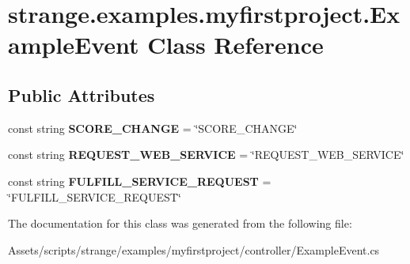 \hypertarget{classstrange_1_1examples_1_1myfirstproject_1_1_example_event}{\section{strange.\-examples.\-myfirstproject.\-Example\-Event Class Reference}
\label{classstrange_1_1examples_1_1myfirstproject_1_1_example_event}
}
\subsection*{Public Attributes}
\begin{DoxyCompactItemize}
\item 
\hypertarget{classstrange_1_1examples_1_1myfirstproject_1_1_example_event_ad6592bc3c2d72644aff81b16bce13942}{const string {\bfseries S\-C\-O\-R\-E\-\_\-\-C\-H\-A\-N\-G\-E} = \char`\"{}S\-C\-O\-R\-E\-\_\-\-C\-H\-A\-N\-G\-E\char`\"{}}\label{classstrange_1_1examples_1_1myfirstproject_1_1_example_event_ad6592bc3c2d72644aff81b16bce13942}

\item 
\hypertarget{classstrange_1_1examples_1_1myfirstproject_1_1_example_event_a901b6e1a0147805f834eb722d52f6ba4}{const string {\bfseries R\-E\-Q\-U\-E\-S\-T\-\_\-\-W\-E\-B\-\_\-\-S\-E\-R\-V\-I\-C\-E} = \char`\"{}R\-E\-Q\-U\-E\-S\-T\-\_\-\-W\-E\-B\-\_\-\-S\-E\-R\-V\-I\-C\-E\char`\"{}}\label{classstrange_1_1examples_1_1myfirstproject_1_1_example_event_a901b6e1a0147805f834eb722d52f6ba4}

\item 
\hypertarget{classstrange_1_1examples_1_1myfirstproject_1_1_example_event_a87945587c630b5ef9d090e4f87be50b2}{const string {\bfseries F\-U\-L\-F\-I\-L\-L\-\_\-\-S\-E\-R\-V\-I\-C\-E\-\_\-\-R\-E\-Q\-U\-E\-S\-T} = \char`\"{}F\-U\-L\-F\-I\-L\-L\-\_\-\-S\-E\-R\-V\-I\-C\-E\-\_\-\-R\-E\-Q\-U\-E\-S\-T\char`\"{}}\label{classstrange_1_1examples_1_1myfirstproject_1_1_example_event_a87945587c630b5ef9d090e4f87be50b2}

\end{DoxyCompactItemize}


The documentation for this class was generated from the following file\-:\begin{DoxyCompactItemize}
\item 
Assets/scripts/strange/examples/myfirstproject/controller/Example\-Event.\-cs\end{DoxyCompactItemize}
